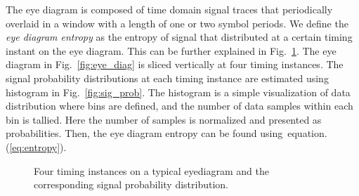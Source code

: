 \documentclass[journal,comsoc, onecolumn, 12pt,draftclsnofoot]{IEEEtran} %
\begin{document}
The eye diagram is composed of time domain signal traces that periodically overlaid in a window with a length of one or two symbol periods.
We define the \textit{eye diagram entropy} as the entropy of signal that distributed at a certain timing instant on the eye diagram. 
This can be further explained in Fig.~\ref{fig:eye_ent}.
The eye diagram in Fig.~\ref{fig:eye_diag} is sliced vertically at four timing instances.
The signal probability distributions at each timing instance are estimated using histogram in Fig.~\ref{fig:sig_prob}.
The histogram is a simple visualization of data distribution where bins are defined, and the number of data samples within each bin is tallied. 
Here the number of samples is normalized and presented as probabilities.
Then, the eye diagram entropy can be found using~equation. (\ref{eq:entropy}). 
\begin{figure}[htbp]
\centering
{}
\caption{Four timing instances on a typical eyediagram and the corresponding signal probability distribution.}
\label{fig:eye_ent} %
\end{figure}
\end{document}
